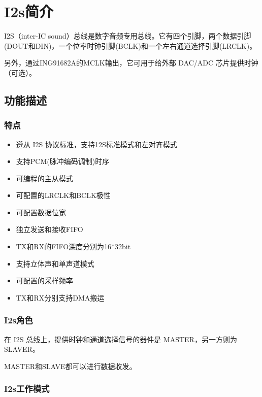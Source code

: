 \documentclass[
  12pt,
]{book}
\begin{document}
\hypertarget{ch-I2s}{%
\chapter{I2s简介}\label{ch-I2s}}

I2S（inter-IC sound）总线是数字音频专用总线。它有四个引脚，两个数据引脚(DOUT和DIN)，一个位率时钟引脚(BCLK)和一个左右通道选择引脚(LRCLK)。

另外，通过ING91682A的MCLK输出，它可用于给外部 DAC/ADC 芯片提供时钟（可选）。

\hypertarget{ux529fux80fdux63cfux8ff0-1}{%
\section{功能描述}\label{ux529fux80fdux63cfux8ff0-1}}

\hypertarget{ux7279ux70b9-1}{%
\subsection{特点}\label{ux7279ux70b9-1}}

\begin{itemize}
\item
  遵从 I2S 协议标准，支持12S标准模式和左对齐模式
\item
  支持PCM(脉冲编码调制)时序
\item
  可编程的主从模式
\item
  可配置的LRCLK和BCLK极性
\item
  可配置数据位宽
\item
  独立发送和接收FIFO
\item
  TX和RX的FIFO深度分别为16*32bit
\item
  支持立体声和单声道模式
\item
  可配置的采样频率
\item
  TX和RX分别支持DMA搬运
\end{itemize}

\hypertarget{i2sux89d2ux8272}{%
\subsection{I2s角色}\label{i2sux89d2ux8272}}

在 I2S 总线上，提供时钟和通道选择信号的器件是 MASTER，另一方则为 SLAVER。

MASTER和SLAVE都可以进行数据收发。

\hypertarget{i2sux5de5ux4f5cux6a21ux5f0f}{%
\subsection{I2s工作模式}\label{i2sux5de5ux4f5cux6a21ux5f0f}}
\end{document}
